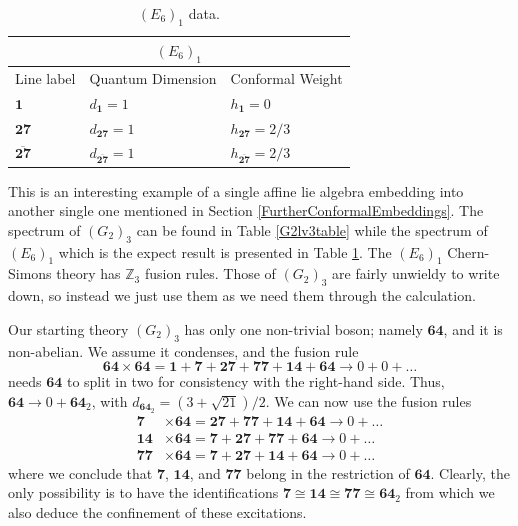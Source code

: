 \documentclass[11pt]{article}
\numberwithin{equation}{section}
\begin{document}
\begin{table}[!b]
\centering
\begin{tabular}[h]{|p{4cm}|p{4cm}|p{4cm}| }
\hline 
\multicolumn{3}{|c|}{$(E_{6})_{1}$} \\
\hline
Line label & Quantum Dimension & Conformal Weight  \\
\hline
$\mathbf{1}$ & $d_{\mathbf{1}} = 1$ & $h_{\mathbf{1}}=0$ \\
$\mathbf{27}$ & $d_{\mathbf{27}} = 1$ & $h_{\mathbf{27}}=2/3$ \\
$\overline{\mathbf{27}}$ & $d_{\overline{\mathbf{27}}} = 1$ & $h_{\overline{\mathbf{27}}}=2/3$ \\
\hline
\end{tabular}
\caption{$(E_{6})_{1}$ data.}  \label{E6lv1table}
\end{table}

This is an interesting example of a single affine lie algebra embedding into another single one mentioned in Section \ref{FurtherConformalEmbeddings}. The spectrum of $(G_{2})_{3}$ can be found in Table \ref{G2lv3table} while the spectrum of $(E_{6})_{1}$ which is the expect result is presented in Table \ref{E6lv1table}. The $(E_{6})_{1}$ Chern-Simons theory has $\mathbb{Z}_{3}$ fusion rules. Those of $(G_{2})_{3}$ are fairly unwieldy to write down, so instead we just use them as we need them through the calculation.

Our starting theory $(G_{2})_{3}$ has only one non-trivial boson; namely $\mathbf{64}$, and it is non-abelian. We assume it condenses, and the fusion rule
\begin{equation}
    \mathbf{64} \times \mathbf{64} = \mathbf{1} + \mathbf{7} + \mathbf{27} + \mathbf{77} + \mathbf{14} + \mathbf{64} \longrightarrow 0 + 0 + \ldots
\end{equation}
needs $\mathbf{64}$ to split in two for consistency with the right-hand side. Thus, $\mathbf{64} \to 0 + \mathbf{64}_{2}$, with $d_{\mathbf{64}_{2}} = (3+\sqrt{21})/2$. We can now use the fusion rules
\begin{align}
    \mathbf{7}  &\times \mathbf{64} = \mathbf{27} + \mathbf{77} + \mathbf{14} + \mathbf{64} \longrightarrow 0 + \ldots \\[0.3cm]
    \mathbf{14} &\times \mathbf{64} = \mathbf{7} + \mathbf{27} + \mathbf{77} + \mathbf{64} \longrightarrow 0 + \ldots \\[0.3cm]
    \mathbf{77} &\times \mathbf{64} = \mathbf{7} + \mathbf{27} + \mathbf{14} + \mathbf{64} \longrightarrow 0 + \ldots
\end{align}
where we conclude that $\mathbf{7}$, $\mathbf{14}$, and $\mathbf{77}$ belong in the restriction of $\mathbf{64}$. Clearly, the only possibility is to have the identifications $\mathbf{7} \cong \mathbf{14} \cong \mathbf{77} \cong \mathbf{64}_{2}$ from which we also deduce the confinement of these excitations.
\end{document}
